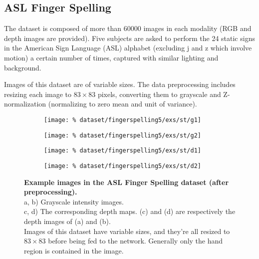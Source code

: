 \subsection{ASL Finger Spelling}

The dataset is composed of more than 60000 images in each modality
(RGB and depth images are provided).
Five subjects are asked to perform the 24 static signs in
the American Sign Language (ASL) alphabet (excluding j and z which involve
motion) a certain number of times, captured with similar lighting
and background.

Images of this dataset are of variable sizes. The data preprocessing
includes resizing each image to $83 \times 83$ pixels,
converting them to grayscale and Z-normalization (normalizing to zero mean
and unit of variance).

\begin{figure}[H]
  \centering
  \hfill
  \begin{subfigure}{0.21\linewidth}
    \centering
    \texttt{[image: \%
      dataset/fingerspelling5/exs/st/g1]}
    \caption{}
  \end{subfigure}
  \hfill
  \begin{subfigure}{0.21\linewidth}
    \centering
    \texttt{[image: \%
      dataset/fingerspelling5/exs/st/g2]}
    \caption{}
  \end{subfigure}
  \hfill
  \begin{subfigure}{0.21\linewidth}
    \centering
    \texttt{[image: \%
      dataset/fingerspelling5/exs/st/d1]}
    \caption{}
  \end{subfigure}
  \hfill
  \begin{subfigure}{0.21\linewidth}
    \centering
    \texttt{[image: \%
      dataset/fingerspelling5/exs/st/d2]}
    \caption{}
  \end{subfigure}
  \caption{%
    \textbf{Example images in the ASL Finger Spelling dataset
      (after preprocessing).}\\[0.1em]
    a, b) Grayscale intensity images.\\[0.1em]
    c, d) The corresponding depth maps. (c) and (d) are respectively the
      depth images of (a) and (b).\\[0.1em]
    Images of this dataset have variable sizes, and they're all resized to
      $83 \times 83$ before being fed to the network. Generally only the
      hand region is contained in the image.}
  \label{fig:fingerspelling_exs}
\end{figure}

